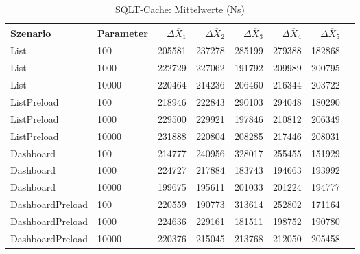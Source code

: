 
\begin{table}[ht]
\setlength{\extrarowheight}{-1pt}
\centering
\caption{SQLT-Cache: Mittelwerte (Ns)}
\begin{tabular}{llrrrrrr}
\toprule
Szenario & Parameter & ${\Delta \overline{X}_1}$ & ${\Delta \overline{X}_2}$ & ${\Delta \overline{X}_3}$ & ${\Delta \overline{X}_4}$ & ${\Delta \overline{X}_5}$ \\
\midrule
	List & 100 & 205581 & 237278 & 285199 & 279388 & 182868 \\
	List & 1000 & 222729 & 227062 & 191792 & 209989 & 200795 \\
	List & 10000 & 220464 & 214236 & 206460 & 216344 & 203722 \\
	ListPreload & 100 & 218946 & 222843 & 290103 & 294048 & 180290 \\
	ListPreload & 1000 & 229500 & 229921 & 197846 & 210812 & 206349 \\
	ListPreload & 10000 & 231888 & 220804 & 208285 & 217446 & 208031 \\
	Dashboard & 100 & 214777 & 240956 & 328017 & 255455 & 151929 \\
	Dashboard & 1000 & 224727 & 217884 & 183743 & 194663 & 193992 \\
	Dashboard & 10000 & 199675 & 195611 & 201033 & 201224 & 194777 \\
	DashboardPreload & 100 & 220559 & 190773 & 313614 & 252802 & 171164 \\
	DashboardPreload & 1000 & 224636 & 229161 & 181511 & 198752 & 190780 \\
	DashboardPreload & 10000 & 220376 & 215045 & 213768 & 212050 & 205458 \\
\bottomrule
\end{tabular}
\label{tab:mittelwerte_sqlt-cache_ns}
\end{table}
	